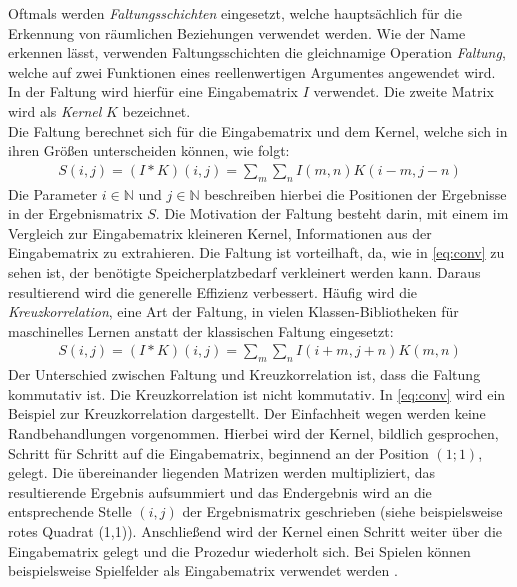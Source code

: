 \documentclass[12pt,a4paper,bibliography=totocnumbered,listof=totocnumbered]{article}
\begin{document}
Oftmals werden \emph{Faltungsschichten} eingesetzt, welche hauptsächlich für die Erkennung von räumlichen Beziehungen verwendet werden. Wie der Name erkennen lässt, verwenden Faltungsschichten die gleichnamige Operation \emph{Faltung}, welche auf zwei Funktionen eines reellenwertigen Argumentes angewendet wird. In der Faltung wird hierfür eine Eingabematrix $I$ verwendet. Die zweite Matrix wird als \emph{Kernel} $K$ bezeichnet.\\Die Faltung berechnet sich für die Eingabematrix und dem Kernel, welche sich in ihren Größen unterscheiden können, wie folgt: 
\begin{align}
S(i,j) = (I \ast K)(i,j) = \sum_{m} \sum_{n} I(m,n)K(i-m,j-n) 
\end{align}
Die Parameter $i \in \mathbb{N}$ und $j \in \mathbb{N}$ beschreiben hierbei die Positionen der Ergebnisse in der Ergebnismatrix $S$. 
Die Motivation der Faltung besteht darin, mit einem im Vergleich zur Eingabematrix kleineren Kernel, Informationen aus der Eingabematrix zu extrahieren. Die Faltung ist vorteilhaft, da, wie in \autoref{eq:conv} zu sehen ist, der benötigte Speicherplatzbedarf verkleinert werden kann. Daraus resultierend wird die generelle Effizienz verbessert. Häufig wird die \emph{Kreuzkorrelation}, eine Art der Faltung, in vielen Klassen-Bibliotheken für maschinelles Lernen anstatt der klassischen Faltung eingesetzt:
\begin{align}
S(i,j) = (I \ast K)(i,j) = \sum_{m} \sum_{n} I(i+m,j+n)K(m,n) 
\end{align}
Der Unterschied zwischen Faltung und Kreuzkorrelation ist, dass die Faltung kommutativ ist. Die Kreuzkorrelation ist nicht kommutativ. In \autoref{eq:conv} wird ein Beispiel zur Kreuzkorrelation dargestellt. Der Einfachheit wegen werden keine Randbehandlungen vorgenommen. Hierbei wird der Kernel, bildlich gesprochen, Schritt für Schritt auf die Eingabematrix, beginnend an der Position $(1;1)$, gelegt. Die übereinander liegenden Matrizen werden multipliziert, das resultierende Ergebnis aufsummiert und das Endergebnis wird an die entsprechende Stelle $(i,j)$ der Ergebnismatrix geschrieben (siehe beispielsweise rotes Quadrat (1,1)). Anschließend wird der Kernel einen Schritt weiter über die Eingabematrix gelegt und die Prozedur wiederholt sich. Bei Spielen können beispielsweise Spielfelder als Eingabematrix verwendet werden \citep[S. 369 ff.]{Goodfellow.2018}. 
\end{document}

